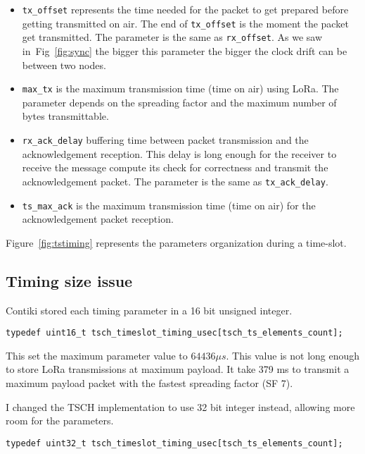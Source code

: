 \begin{itemize}
  \item \lstinline{tx_offset} represents the time needed for the packet to get
    prepared before getting transmitted on air. The end of
    \lstinline{tx_offset} is the moment the packet get transmitted. 
    The parameter is the same as \lstinline{rx_offset}.
    As we saw in~Fig~\ref{fig:sync} the bigger this parameter the bigger the
    clock drift can be between two nodes.
  \item \lstinline{max_tx} is the maximum transmission time (time on air) using
    LoRa. The parameter depends on the spreading factor and the maximum number
    of bytes transmittable.
  \item \lstinline{rx_ack_delay} buffering time between packet transmission and
    the acknowledgement reception. This delay is long enough for the receiver
    to receive the message compute its check for correctness and transmit the acknowledgement packet.
    The parameter is the same as \lstinline{tx_ack_delay}.
  \item \lstinline{ts_max_ack} is the maximum transmission time (time on air) for
    the acknowledgement packet reception.
\end{itemize}

Figure~\ref{fig:tstiming} represents the parameters organization during
a time-slot.



\subsection{Timing size issue}

Contiki stored each timing parameter in a 16 bit unsigned integer.

\begin{lstlisting}
typedef uint16_t tsch_timeslot_timing_usec[tsch_ts_elements_count];
\end{lstlisting}

This set the maximum parameter value to $64436\mu s$.
This value is not long enough to store LoRa transmissions at maximum payload.
It take 379 ms to transmit a maximum payload packet with the fastest spreading
factor (SF 7).

I changed the TSCH implementation to use 32 bit integer instead, allowing more
room for the parameters.

\begin{lstlisting}
typedef uint32_t tsch_timeslot_timing_usec[tsch_ts_elements_count];
\end{lstlisting}

